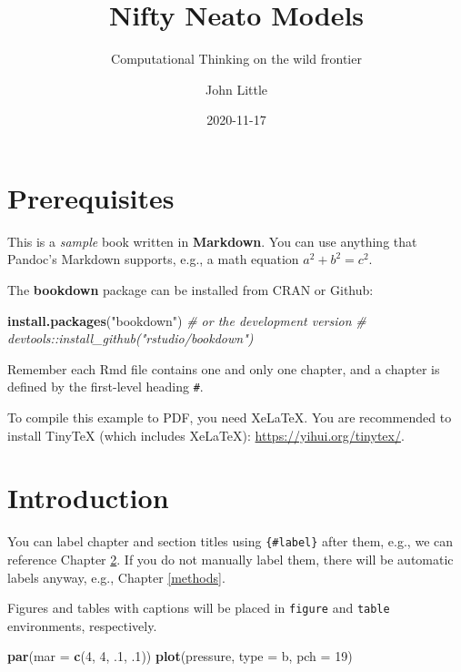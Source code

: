 \documentclass[
]{book}
\title{Nifty Neato Models}
\subtitle{Computational Thinking on the wild frontier}
\author{John Little}
\date{2020-11-17}
\newenvironment{Shaded}{\begin{snugshade}}{\end{snugshade}}
\newcommand{\CommentTok}[1]{\textcolor[rgb]{0.56,0.35,0.01}{\textit{#1}}}
\newcommand{\DataTypeTok}[1]{\textcolor[rgb]{0.13,0.29,0.53}{#1}}
\newcommand{\DecValTok}[1]{\textcolor[rgb]{0.00,0.00,0.81}{#1}}
\newcommand{\FloatTok}[1]{\textcolor[rgb]{0.00,0.00,0.81}{#1}}
\newcommand{\KeywordTok}[1]{\textcolor[rgb]{0.13,0.29,0.53}{\textbf{#1}}}
\newcommand{\NormalTok}[1]{#1}
\newcommand{\StringTok}[1]{\textcolor[rgb]{0.31,0.60,0.02}{#1}}
\begin{document}
\maketitle

{
\setcounter{tocdepth}{1}
\tableofcontents
}
\hypertarget{prerequisites}{%
\chapter{Prerequisites}\label{prerequisites}}

This is a \emph{sample} book written in \textbf{Markdown}. You can use anything that Pandoc's Markdown supports, e.g., a math equation \(a^2 + b^2 = c^2\).

The \textbf{bookdown} package can be installed from CRAN or Github:

\begin{Shaded}
\begin{Highlighting}[]
\KeywordTok{install.packages}\NormalTok{(}\StringTok{"bookdown"}\NormalTok{)}
\CommentTok{\# or the development version}
\CommentTok{\# devtools::install\_github("rstudio/bookdown")}
\end{Highlighting}
\end{Shaded}

Remember each Rmd file contains one and only one chapter, and a chapter is defined by the first-level heading \texttt{\#}.

To compile this example to PDF, you need XeLaTeX. You are recommended to install TinyTeX (which includes XeLaTeX): \url{https://yihui.org/tinytex/}.

\hypertarget{intro}{%
\chapter{Introduction}\label{intro}}

You can label chapter and section titles using \texttt{\{\#label\}} after them, e.g., we can reference Chapter \ref{intro}. If you do not manually label them, there will be automatic labels anyway, e.g., Chapter \ref{methods}.

Figures and tables with captions will be placed in \texttt{figure} and \texttt{table} environments, respectively.

\begin{Shaded}
\begin{Highlighting}[]
\KeywordTok{par}\NormalTok{(}\DataTypeTok{mar =} \KeywordTok{c}\NormalTok{(}\DecValTok{4}\NormalTok{, }\DecValTok{4}\NormalTok{, }\FloatTok{.1}\NormalTok{, }\FloatTok{.1}\NormalTok{))}
\KeywordTok{plot}\NormalTok{(pressure, }\DataTypeTok{type =} \StringTok{\textquotesingle{}b\textquotesingle{}}\NormalTok{, }\DataTypeTok{pch =} \DecValTok{19}\NormalTok{)}
\end{Highlighting}
\end{Shaded}
\end{document}
